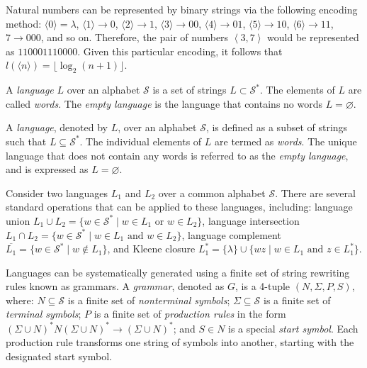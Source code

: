 \begin{example}
Natural numbers can be represented by binary strings via the following encoding method: $\langle 0 \rangle = \lambda$, $\langle 1 \rangle \rightarrow 0$, $\langle 2 \rangle \rightarrow 1$, $\langle 3 \rangle \rightarrow 00$, $\langle 4 \rangle \rightarrow 01$, $\langle 5 \rangle \rightarrow 10$, $\langle 6 \rangle \rightarrow 11$, $7 \rightarrow 000$, and so on. Therefore, the pair of numbers $\left\langle 3, 7 \right\rangle$ would be represented as $110001110000$. Given this particular encoding, it follows that $l \left( \langle n \rangle \right) = \lfloor \log_2 (n + 1) \rfloor$.
\end{example}

A \emph{language} $L$ over an alphabet $\mathcal{S}$ is a set of strings $L \subset \mathcal{S}^{\ast}$. The elements of $L$ are called \emph{words}. The \emph{empty language} is the language that contains no words $L = \varnothing$. 

A \emph{language}, denoted by $L$, over an alphabet $\mathcal{S}$, is defined as a subset of strings such that $L \subseteq \mathcal{S}^{\ast}$. The individual elements of $L$ are termed as \emph{words}. The unique language that does not contain any words is referred to as the \emph{empty language}, and is expressed as $L = \varnothing$.

Consider two languages $L_1$ and $L_2$ over a common alphabet $\mathcal{S}$. There are several standard operations that can be applied to these languages, including: language union $L_1 \cup L_2 = \{ w \in \mathcal{S}^{\ast} \mid w \in L_1 \text{ or } w \in L_2 \}$, language intersection $L_1 \cap L_2 = \{ w \in \mathcal{S}^{\ast} \mid w \in L_1 \text{ and } w \in L_2 \}$, language complement $\overline{L_1} = \{ w \in \mathcal{S}^{\ast} \mid w \notin L_1 \}$, and Kleene closure $L_1^\ast = \{ \lambda \} \cup \{ wz \mid w \in L_1 \text{ and } z \in L_1^\ast \}$.

Languages can be systematically generated using a finite set of string rewriting rules known as grammars. A \emph{grammar}, denoted as $G$, is a 4-tuple $(N, \Sigma, P, S)$, where: $N \subseteq \mathcal{S}$ is a finite set of \emph{nonterminal symbols}; $\Sigma \subseteq \mathcal{S}$ is a finite set of \emph{terminal symbols}; $P$ is a finite set of \emph{production rules} in the form $( \Sigma \cup N )^\ast N ( \Sigma \cup N)^\ast \rightarrow (\Sigma \cup N)^\ast$; and $S \in N$ is a special \emph{start symbol}. Each production rule transforms one string of symbols into another, starting with the designated start symbol.

